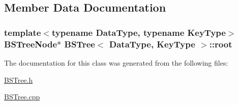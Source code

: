\begin{DoxyCode}
\end{DoxyCode}
 

\subsection{\-Member \-Data \-Documentation}
\hypertarget{class_b_s_tree_a83534afce9094181ac031f9f596a8625}{
\subsubsection[{root}]{\setlength{\rightskip}{0pt plus 5cm}template$<$typename \-Data\-Type, typename \-Key\-Type$>$ {\bf \-B\-S\-Tree\-Node}$\ast$ {\bf \-B\-S\-Tree}$<$ \-Data\-Type, \-Key\-Type $>$\-::{\bf root}}}\label{class_b_s_tree_a83534afce9094181ac031f9f596a8625}


\-The documentation for this class was generated from the following files\-:\begin{DoxyCompactItemize}
\item 
\hyperlink{_b_s_tree_8h}{\-B\-S\-Tree.\-h}\item 
\hyperlink{_b_s_tree_8cpp}{\-B\-S\-Tree.\-cpp}\end{DoxyCompactItemize}
